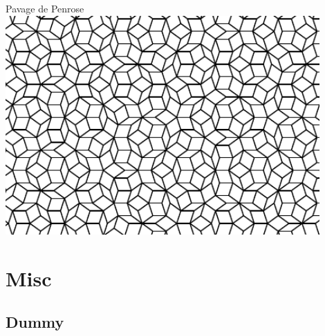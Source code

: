 \documentclass[xcolor=x11names,compress,professionalfonts]{beamer}
\renewcommand{\(}{\begin{columns}}
\renewcommand{\)}{\end{columns}}
\newcommand{\<}[1]{\begin{column}{#1}}
\renewcommand{\>}{\end{column}}
\begin{document}
\begin{frame}{Pavage de Penrose}
\centering
\includegraphics[width=0.9\textwidth]{img/Penrose_tiling_cropped.pdf}

\end{frame}

\section{Misc}
\subsection{Dummy}
\end{document}
